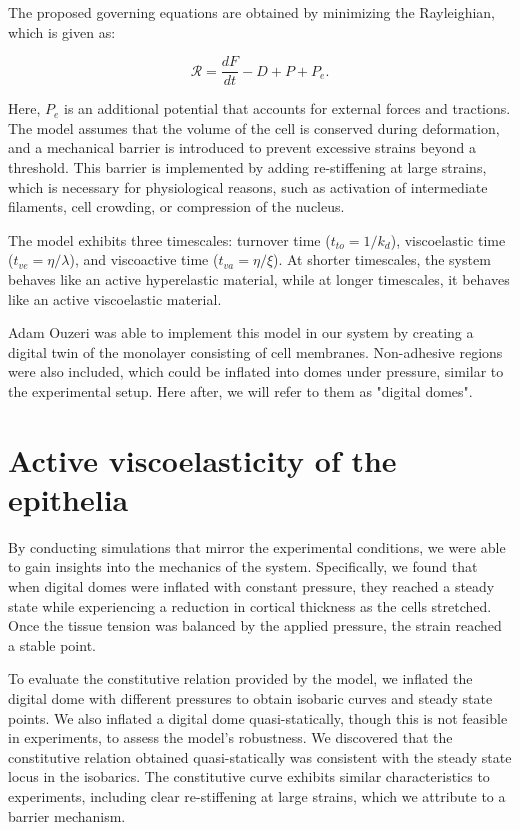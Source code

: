 The proposed governing equations are obtained by minimizing the Rayleighian, which is given as:

$$ \mathcal{R} = \frac{dF}{dt} - D + P + P_e .$$

Here, $P_e$ is an additional potential that accounts for external forces and tractions. The model assumes that the volume of the cell is conserved during deformation, and a mechanical barrier is introduced to prevent excessive strains beyond a threshold. This barrier is implemented by adding re-stiffening at large strains, which is necessary for physiological reasons, such as activation of intermediate filaments, cell crowding, or compression of the nucleus.

The model exhibits three timescales: turnover time ($t_{to} = 1/k_d$), viscoelastic time ($t_{ve} = \eta/\lambda$), and viscoactive time ($t_{va} = \eta/\xi$). At shorter timescales, the system behaves like an active hyperelastic material, while at longer timescales, it behaves like an active viscoelastic material.

Adam Ouzeri was able to implement this model in our system by creating a digital twin of the monolayer consisting of cell membranes. Non-adhesive regions were also included, which could be inflated into domes under pressure, similar to the experimental setup. Here after, we will refer to them as "digital domes".

\hypertarget{active-viscoelasticity-of-the-epithelia}{%
	\section{Active viscoelasticity of the
		epithelia}\label{active-viscoelasticity-of-the-epithelia}}

By conducting simulations that mirror the experimental conditions, we were able to gain insights into the mechanics of the system. Specifically, we found that when digital domes were inflated with constant pressure, they reached a steady state while experiencing a reduction in cortical thickness as the cells stretched. Once the tissue tension was balanced by the applied pressure, the strain reached a stable point.

To evaluate the constitutive relation provided by the model, we inflated the digital dome with different pressures to obtain isobaric curves and steady state points. We also inflated a digital dome quasi-statically, though this is not feasible in experiments, to assess the model's robustness. We discovered that the constitutive relation obtained quasi-statically was consistent with the steady state locus in the isobarics. The constitutive curve exhibits similar characteristics to experiments, including clear re-stiffening at large strains, which we attribute to a barrier mechanism.

